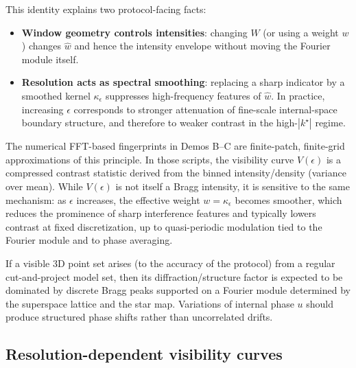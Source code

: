 This identity explains two protocol-facing facts:
\begin{itemize}[leftmargin=*,itemsep=2pt]
  \item \textbf{Window geometry controls intensities}: changing $W$ (or using a weight $w$) changes $\widehat w$ and hence the intensity envelope without moving the Fourier module itself.
  \item \textbf{Resolution acts as spectral smoothing}: replacing a sharp indicator by a smoothed kernel $\kappa_\epsilon$ suppresses high-frequency features of $\widehat w$. In practice, increasing $\epsilon$ corresponds to stronger attenuation of fine-scale internal-space boundary structure, and therefore to weaker contrast in the high-$|k^\star|$ regime.
\end{itemize}

The numerical FFT-based fingerprints in Demos B--C are finite-patch, finite-grid approximations of this principle. In those scripts, the visibility curve $V(\epsilon)$ is a compressed contrast statistic derived from the binned intensity/density (variance over mean). While $V(\epsilon)$ is not itself a Bragg intensity, it is sensitive to the same mechanism: as $\epsilon$ increases, the effective weight $w=\kappa_\epsilon$ becomes smoother, which reduces the prominence of sharp interference features and typically lowers contrast at fixed discretization, up to quasi-periodic modulation tied to the Fourier module and to phase averaging.

\begin{proposition}\label{prop:P1}
If a visible 3D point set arises (to the accuracy of the protocol) from a regular cut-and-project model set, then its diffraction/structure factor is expected to be dominated by discrete Bragg peaks supported on a Fourier module determined by the superspace lattice and the star map. Variations of internal phase $u$ should produce structured phase shifts rather than uncorrelated drifts.
\end{proposition}

\subsection{Resolution-dependent visibility curves}\label{sec:falsifiability:visibility}

